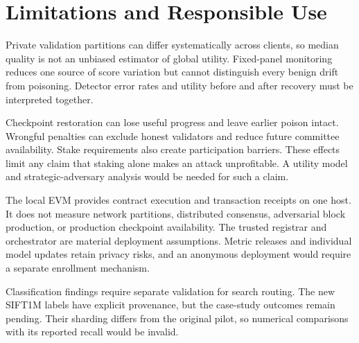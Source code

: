 \section{Limitations and Responsible Use}
Private validation partitions can differ systematically across clients, so median
quality is not an unbiased estimator of global utility. Fixed-panel monitoring
reduces one source of score variation but cannot distinguish every benign drift
from poisoning. Detector error rates and utility before and after recovery must be
interpreted together.

Checkpoint restoration can lose useful progress and leave earlier poison intact.
Wrongful penalties can exclude honest validators and reduce future committee
availability. Stake requirements also create participation barriers. These effects
limit any claim that staking alone makes an attack unprofitable. A utility model
and strategic-adversary analysis would be needed for such a claim.

The local EVM provides contract execution and transaction receipts on one host.
It does not measure network partitions, distributed consensus, adversarial block
production, or production checkpoint availability. The trusted registrar and
orchestrator are material deployment assumptions. Metric releases and individual
model updates retain privacy risks, and an anonymous deployment would require a
separate enrollment mechanism.

Classification findings require separate validation for search routing.
The new SIFT1M labels have explicit provenance, but the case-study outcomes
remain pending. Their sharding differs from the original pilot, so numerical
comparisons with its reported recall would be invalid.
